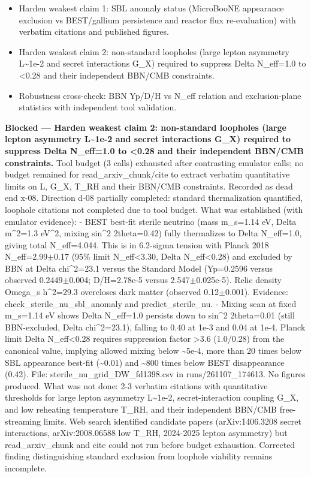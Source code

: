 \documentclass[11pt,a4paper]{article}
\begin{document}
\begin{itemize}
  \item Harden weakest claim 1: SBL anomaly status (MicroBooNE appearance exclusion vs BEST/gallium persistence and reactor flux re-evaluation) with verbatim citations and published figures.
  \item Harden weakest claim 2: non-standard loopholes (large lepton asymmetry L\textasciitilde{}1e-2 and secret interactions G\_X) required to suppress Delta N\_eff=1.0 to \textless{}0.28 and their independent BBN/CMB constraints.
  \item Robustness cross-check: BBN Yp/D/H vs N\_eff relation and exclusion-plane statistics with independent tool validation.
\end{itemize}
\textbf{Blocked --- Harden weakest claim 2: non-standard loopholes (large lepton asymmetry L\textasciitilde{}1e-2 and secret interactions G\_X) required to suppress Delta N\_eff=1.0 to \textless{}0.28 and their independent BBN/CMB constraints.} Tool budget (3 calls) exhausted after contrasting emulator calls; no budget remained for read\_arxiv\_chunk/cite to extract verbatim quantitative limits on L, G\_X, T\_RH and their BBN/CMB constraints. Recorded as dead end x-08. Direction d-08 partially completed: standard thermalization quantified, loophole citations not completed due to tool budget. What was established (with emulator evidence): - BEST best-fit sterile neutrino (mass m\_s=1.14 eV, Delta m\textasciicircum{}2=1.3 eV\textasciicircum{}2, mixing sin\textasciicircum{}2 2theta=0.42) fully thermalizes to Delta N\_eff=1.0, giving total N\_eff=4.044. This is in 6.2-sigma tension with Planck 2018 N\_eff=2.99$\pm$0.17 (95\% limit N\_eff\textless{}3.30, Delta N\_eff\textless{}0.28) and excluded by BBN at Delta chi\textasciicircum{}2=23.1 versus the Standard Model (Yp=0.2596 versus observed 0.2449$\pm$0.004; D/H=2.78e-5 versus 2.547$\pm$0.025e-5). Relic density Omega\_s h\textasciicircum{}2=29.3 overcloses dark matter (observed 0.12$\pm$0.001). Evidence: check\_sterile\_nu\_sbl\_anomaly and predict\_sterile\_nu. - Mixing scan at fixed m\_s=1.14 eV shows Delta N\_eff=1.0 persists down to sin\textasciicircum{}2 2theta=0.01 (still BBN-excluded, Delta chi\textasciicircum{}2=23.1), falling to 0.40 at 1e-3 and 0.04 at 1e-4. Planck limit Delta N\_eff\textless{}0.28 requires suppression factor \textgreater{}3.6 (1.0/0.28) from the canonical value, implying allowed mixing below \textasciitilde{}5e-4, more than 20 times below SBL appearance best-fit (\textasciitilde{}0.01) and \textasciitilde{}800 times below BEST disappearance (0.42). File: sterile\_nu\_grid\_DW\_fd1398.csv in runs/261107\_174613. No figures produced. What was not done: 2-3 verbatim citations with quantitative thresholds for large lepton asymmetry L\textasciitilde{}1e-2, secret-interaction coupling G\_X, and low reheating temperature T\_RH, and their independent BBN/CMB free-streaming limits. Web search identified candidate papers (arXiv:1406.3208 secret interactions, arXiv:2008.06588 low T\_RH, 2024-2025 lepton asymmetry) but read\_arxiv\_chunk and cite could not run before budget exhaustion. Corrected finding distinguishing standard exclusion from loophole viability remains incomplete.
\end{document}
